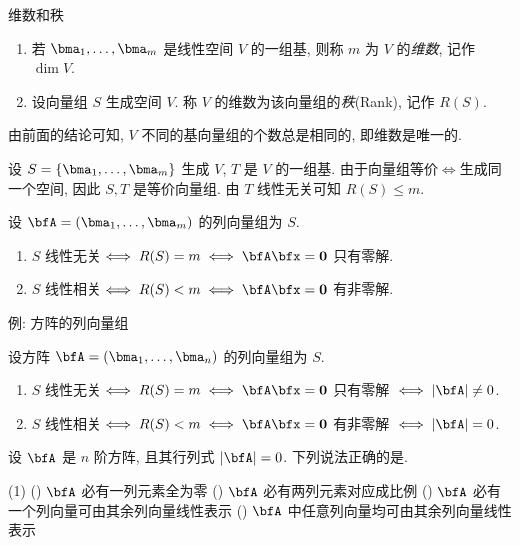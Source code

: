 \begin{frame}{维数和秩}
	\onslide<+->
	\begin{definition}
		\begin{enumerate}
			\item 若 $\bma_1,\dots,\bma_m$ 是线性空间 $V$ 的一组基, 则称 $m$ 为 $V$ 的\emph{维数}, 记作 $\dim V$.
			\item 设向量组 $S$ 生成空间 $V$.
			称 $V$ 的维数为该向量组的\emph{秩}(Rank), 记作 $R(S)$.
		\end{enumerate}
	\end{definition}
	\onslide<+->
	由前面的结论可知, $V$ 不同的基向量组的个数总是相同的, 即维数是唯一的.

	\onslide<+->
	设 $S=\{\bma_1,\dots,\bma_m\}$ 生成 $V$,
	\onslide<+->
	$T$ 是 $V$ 的一组基.
	\onslide<+->
	由于向量组等价$\iff$生成同一个空间, 因此 $S,T$ 是等价向量组.
	\onslide<+->
	由 $T$ 线性无关可知 $R(S)\le m$.
	\onslide<+->
	\begin{theorem}
		设 $\bfA=(\bma_1,\dots,\bma_m)$ 的列向量组为 $S$.
		\begin{enumerate}
			\item $S$ 线性无关$\iff R(S)=m\iff\bfA\bfx={\bf0}$ 只有零解.
			\item $S$ 线性相关$\iff R(S)<m\iff\bfA\bfx={\bf0}$ 有非零解.
		\end{enumerate}
	\end{theorem}
\end{frame}


\begin{frame}{例: 方阵的列向量组}
	\onslide<+->
	\begin{corollary}
		设方阵 $\bfA=(\bma_1,\dots,\bma_n)$ 的列向量组为 $S$.
		\begin{enumerate}
			\item $S$ 线性无关$\iff R(S)=m\iff\bfA\bfx={\bf0}$ 只有零解 $\iff |\bfA|\neq0$.
			\item $S$ 线性相关$\iff R(S)<m\iff\bfA\bfx={\bf0}$ 有非零解 $\iff |\bfA|=0$.
		\end{enumerate}
	\end{corollary}
	\onslide<+->
	\begin{exercise}
		设 $\bfA$ 是 $n$ 阶方阵, 且其行列式 $|\bfA|=0$. 下列说法正确的是.
		\begin{taskschoice}(1)
			() $\bfA$ 必有一列元素全为零
			() $\bfA$ 必有两列元素对应成比例
			() $\bfA$ 必有一个列向量可由其余列向量线性表示
			() $\bfA$ 中任意列向量均可由其余列向量线性表示
		\end{taskschoice}
	\end{exercise}
\end{frame}



